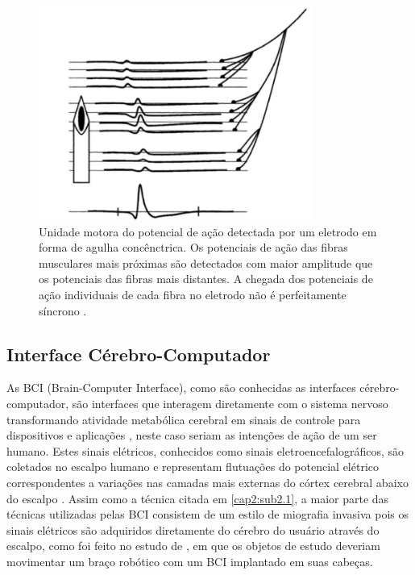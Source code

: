 \begin{figure}[H]
\centering
\includegraphics[width = 0.8\textwidth]{img/Merletti2004_EMG.JPG}
\caption[Eletrodo em Forma de Agulha Para Eletromiografia de Profundidade]{Unidade motora do potencial de ação detectada por um eletrodo em forma de agulha concênctrica. Os potenciais de ação das fibras musculares mais próximas são detectados com maior amplitude que os potenciais das fibras mais distantes. A chegada dos potenciais de ação individuais de cada fibra no eletrodo não é perfeitamente síncrono \cite{merletti2004electromyography}.}
\label{Merletti2004_EMG}
\end{figure}

\subsection{Interface Cérebro-Computador}\label{cap2:sub2.2}

As BCI (Brain-Computer Interface), como são conhecidas as interfaces cérebro-computador, são interfaces que interagem diretamente com o sistema nervoso transformando atividade metabólica cerebral em sinais de controle para dispositivos e aplicações \cite{scherer2007self}, neste caso seriam as intenções de ação de um ser humano. Estes sinais elétricos, conhecidos como sinais eletroencefalográficos, são coletados no escalpo humano e representam flutuações do potencial elétrico correspondentes a variações nas camadas mais externas do córtex cerebral abaixo do escalpo \cite{vidal1973toward}. Assim como a técnica citada em \ref{cap2:sub2.1}, a maior parte das técnicas utilizadas pelas BCI consistem de um estilo de miografia invasiva pois os sinais elétricos são adquiridos diretamente do cérebro do usuário através do escalpo, como foi feito no estudo de \cite{hochberg2012reach}, em que os objetos de estudo deveriam movimentar um braço robótico com um BCI implantado em suas cabeças. 

